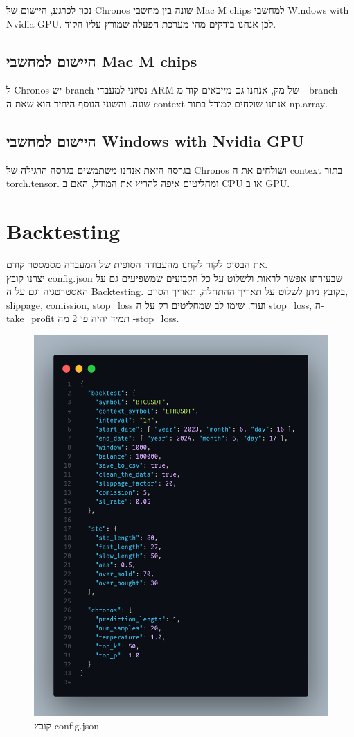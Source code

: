 \documentclass[a4paper,11pt]{article}
\newcommand{\te}[1]{\textenglish{#1}}
\begin{document}
\begin{RTL}
נכון לכרגע, היישום של \te{Chronos}  שונה בין מחשבי \te{Mac M chips} למחשבי \te{Windows with Nvidia GPU}. לכן אנחנו בודקים מהי מערכת הפעלה שמורץ עליו הקוד.

\subsection*{היישום למחשבי \te{Mac M chips}}
ל \te{Chronos} יש \te{branch} נסיוני למעבדי \te{ARM} של מק, אנחנו גם מייבאים קוד מ - \te{branch} שונה. והשוני הנוסף היחיד הוא שאת ה \te{context} אנחנו שולחים למודל בתור \te{np.array}.

\subsection*{היישום למחשבי \te{Windows with Nvidia GPU}}
בגרסה הזאת אנחנו משתמשים בגרסה הרגילה של \te{Chronos} ושולחים את ה \te{context} בתור \te{torch.tensor}. ומחליטים איפה להריץ את המודל, האם ב \te{CPU} או ב \te{GPU}.
\newpage
\section{\te{Backtesting}}
את הבסיס לקוד לקחנו מהעבודה הסופית של המעבדה מסמסטר קודם. \\
יצרנו קובץ \te{config.json} שבעזרתו אפשר לראות ולשלוט על כל הקבועים שמשפיעים גם על האסטרטגיה וגם על ה \te{Backtesting}. בקובץ ניתן לשלוט על תאריך ההתחלה, תאריך הסיום, \te{slippage, comission, stop\_loss} ועוד. שימו לב שמחליטים רק על ה \te{stop\_loss}, ה-\te{take\_profit} תמיד יהיה פי 2 מה -\te{stop\_loss}. 
\begin{figure}[H]
    \centering
    \includegraphics[width=.8\textwidth]{config.png}
    \caption{קובץ \te{config.json}}
\end{figure}


\end{RTL}
\end{document}
